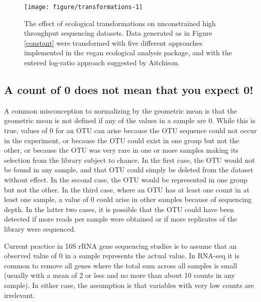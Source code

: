 \documentclass[11pt]{article}\usepackage[]{graphicx}\usepackage[]{color}
\makeatletter
\def\maxwidth{ %
  \ifdim\Gin@nat@width>\linewidth
    \linewidth
  \else
    \Gin@nat@width
  \fi
}
\newenvironment{knitrout}{}{} %
\makeatother
\begin{document}
\begin{figure}
\begin{center}

\begin{knitrout}
\color{fgcolor}
\texttt{[image: figure/transformations-1]} 

\end{knitrout}
\caption{The effect of ecological transformations on unconstrained high throughput sequencing datasets. Data generated as in Figure \ref{constant} were transformed with five different approaches implemented in the vegan ecological analysis package, and with the entered log-ratio approach suggested by Aitchison.   }
\label{transform}
\end{center}
\end{figure}




\subsection{A count of 0 does not mean that you expect 0!}
A common misconception to normalizing by the geometric mean is that the geometric mean is not defined if any of the values in a sample are 0. While this is true, values of 0 for an OTU can arise because the OTU sequence could not occur in the experiment, or because the OTU could exist in one group but not the other, or because the OTU was very rare in one or more samples making its selection from the library subject to chance. In the first case, the OTU would not be found in any sample, and that OTU could simply be deleted from the dataset without effect. In the second case, the OTU would be represented in one group but not the other. In the third case, where an OTU has at least one count in at least one sample,  a value of 0 could arise in other samples because of sequencing depth. In the latter two  cases, it is possible that the OTU could  have been detected if more reads per sample were obtained or if more replicates of the library were sequenced.  

Current practice in 16S rRNA gene sequencing studies is to assume that an observed value of 0 in a sample represents the actual value. In RNA-seq it is common to remove all genes where the total sum across all samples is small (usually with a mean of 2 or less and no more than about 10 counts in any sample). In either case, the assumption is that variables with very low counts are irrelevant. 
\end{document}
